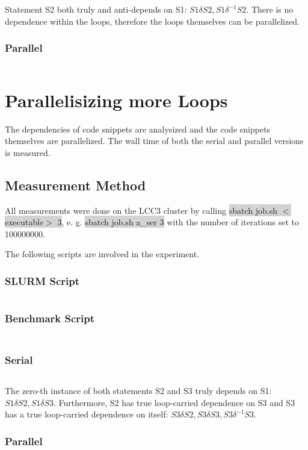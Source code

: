 \documentclass[parskip]{scrartcl}
\begin{document}
	Statement S2 both truly and anti-depends on S1: $S1\delta S2, S1\delta^{-1} S2$. There is no dependence within the loops, therefore the loops themselves can be parallelized.
	\subsubsection{Parallel}
	\inputminted	[linenos]{c}{ex1/c_par.c}
	
	\section{Parallelisizing more Loops}
	The dependencies of code snippets are analysized and the code snippets themselves are parallelized. The wall time of both the serial and parallel versions is measured.
	
	\subsection{Measurement Method}
	All measurements were done on the LCC3 cluster by calling \colorbox{lightgray}{sbatch job.sh $<$executable$>$ 3}, e. g. \colorbox{lightgray}{sbatch job.sh a\_ser 3} with the number of iterations set to 100000000.
	
	The following scripts are involved in the experiment.
	\subsubsection{SLURM Script}
	\inputminted[linenos]{bash}{ex2/job.sh}
	\subsubsection{Benchmark Script}
	\inputminted[linenos]{bash}{ex2/benchmark.sh}
	
	\subsection{}
	\subsubsection{Serial}
	\inputminted	[linenos]{c}{ex2/a_ser.h}
	
	The zero-th instance of both statements S2 and S3 truly depends on S1: $S1\delta S2, S1\delta S3$. Furthermore, S2 has true loop-carried dependence on S3 and S3 has a true loop-carried dependence on itself: $S3\delta S2, S3\delta S3, S3\delta^{-1} S3$.
	\subsubsection{Parallel}
	\inputminted	[linenos]{c}{ex2/a_par.h}
\end{document}
